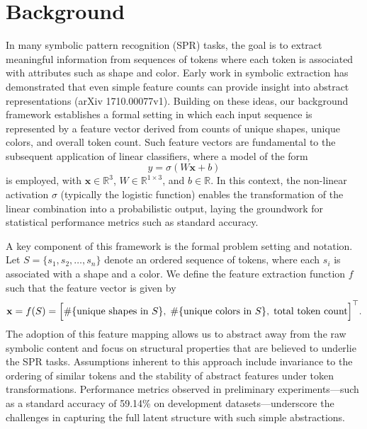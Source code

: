 \documentclass{article}
\begin{document}
\section{Background}
In many symbolic pattern recognition (SPR) tasks, the goal is to extract meaningful information from sequences of tokens where each token is associated with attributes such as shape and color. Early work in symbolic extraction has demonstrated that even simple feature counts can provide insight into abstract representations (arXiv 1710.00077v1). Building on these ideas, our background framework establishes a formal setting in which each input sequence is represented by a feature vector derived from counts of unique shapes, unique colors, and overall token count. Such feature vectors are fundamental to the subsequent application of linear classifiers, where a model of the form 
\[
\hat{y} = \sigma(W\mathbf{x} + b)
\]
is employed, with \(\mathbf{x} \in \mathbb{R}^3\), \(W \in \mathbb{R}^{1 \times 3}\), and \(b \in \mathbb{R}\). In this context, the non-linear activation \(\sigma\) (typically the logistic function) enables the transformation of the linear combination into a probabilistic output, laying the groundwork for statistical performance metrics such as standard accuracy.

A key component of this framework is the formal problem setting and notation. Let \(S = \{s_1, s_2, \ldots, s_n\}\) denote an ordered sequence of tokens, where each \(s_i\) is associated with a shape and a color. We define the feature extraction function \(f\) such that the feature vector is given by 
\[
\mathbf{x} = f(S) = \Bigl[ \#\{\text{unique shapes in } S\}, \; \#\{\text{unique colors in } S\}, \; \text{total token count} \Bigr]^\top.
\]
The adoption of this feature mapping allows us to abstract away from the raw symbolic content and focus on structural properties that are believed to underlie the SPR tasks. Assumptions inherent to this approach include invariance to the ordering of similar tokens and the stability of abstract features under token transformations. Performance metrics observed in preliminary experiments—such as a standard accuracy of 59.14\% on development datasets—underscore the challenges in capturing the full latent structure with such simple abstractions.
\end{document}
